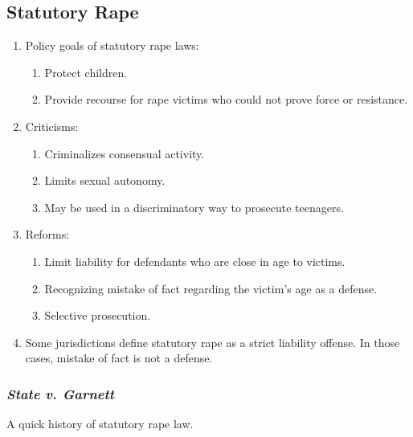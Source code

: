 \subsection{Statutory Rape}

\begin{enumerate}
    \item Policy goals of statutory rape laws:
    \begin{enumerate}
        \item Protect children.
        \item Provide recourse for rape victims who could not prove force or 
        resistance.
    \end{enumerate}
    \item Criticisms:
    \begin{enumerate}
        \item Criminalizes consensual activity.
        \item Limits sexual autonomy.
        \item May be used in a discriminatory way to prosecute teenagers.
    \end{enumerate}
    \item Reforms:
    \begin{enumerate}
        \item Limit liability for defendants who are close in age to victims.
        \item Recognizing mistake of fact regarding the victim's age as a 
        defense.
        \item Selective prosecution.
    \end{enumerate}
    \item Some jurisdictions define statutory rape as a strict liability 
    offense. In those cases, mistake of fact is not a defense.
\end{enumerate}

\subsubsection{\emph{State v. Garnett}}

A quick history of statutory rape law.

